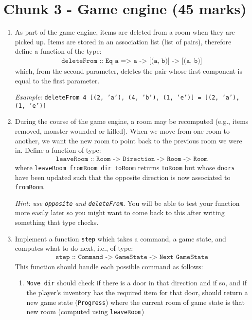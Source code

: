 \documentclass{article}
\newcommand{\topMarks}[1]{\marginnote{(#1 marks)}}
\begin{document}
\section*{Chunk 3 - Game engine (45 marks)}

\begin{enumerate}[leftmargin=1.4em,resume]

\item \topMarks{5} As part of the game engine, items are deleted from
  a room when they are picked up. Items are stored in an association
  list (list of pairs), therefore define a function of the type:
%
\begin{align*}
\texttt{deleteFrom :: Eq a => a -> [(a, b)] -> [(a, b)]}
\end{align*}
%
which, from the second parameter, deletes the pair whose first
component is equal to the first parameter.

\emph{Example:} \texttt{deleteFrom 4 [(2, 'a'), (4, 'b'), (1, 'e')]
= [(2, 'a'), (1, 'e')]}

\item \topMarks{4} During the course of the game engine, a room may
be recomputed (e.g., items removed, monster wounded
or killed). When we move from one room to another, we want
the new room to point back to the previous room we were in. Define
a function of type:
%
\begin{align*}
\texttt{leaveRoom :: Room -> Direction -> Room -> Room}
\end{align*}
%
where \texttt{leaveRoom fromRoom dir toRoom} returns \texttt{toRoom}
but whose \texttt{doors} have been updated such that the opposite
direction is now associated to \texttt{fromRoom}.

\emph{Hint: use \texttt{opposite} and
\texttt{deleteFrom}.} You will be able to test your function
more easily later so you might want to come back to this after
writing something that type checks.


\item \topMarks{15} Implement a function \texttt{step} which takes a command,
a game state, and computes what to do next, i.e., of type:
%
\begin{align*}
\texttt{step :: Command -> GameState -> Next GameState}
\end{align*}
%
This function should handle each possible
command as follows:
%
\begin{enumerate}
\item \texttt{Move dir} should check
if there is a door in that direction and if so, and if the player's
inventory has the required item for that door, should return
a new game state (\texttt{Progress}) where the current room of game
state is that new room (computed using \texttt{leaveRoom})


\end{enumerate}
\end{enumerate}
\end{document}
